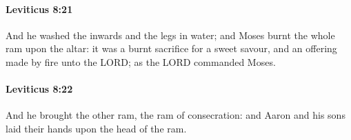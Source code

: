 		\paragraph{Leviticus 8:21} %
			\label{LEVITICUS-8-21}

			And he washed the inwards and the legs in water; and Moses burnt the whole ram upon the altar: it was a burnt sacrifice for a sweet savour, and an offering made by fire unto the LORD; as the LORD commanded Moses.


		\paragraph{Leviticus 8:22} %
			\label{LEVITICUS-8-22}

			And he brought the other ram, the ram of consecration: and Aaron and his sons laid their hands upon the head of the ram.


